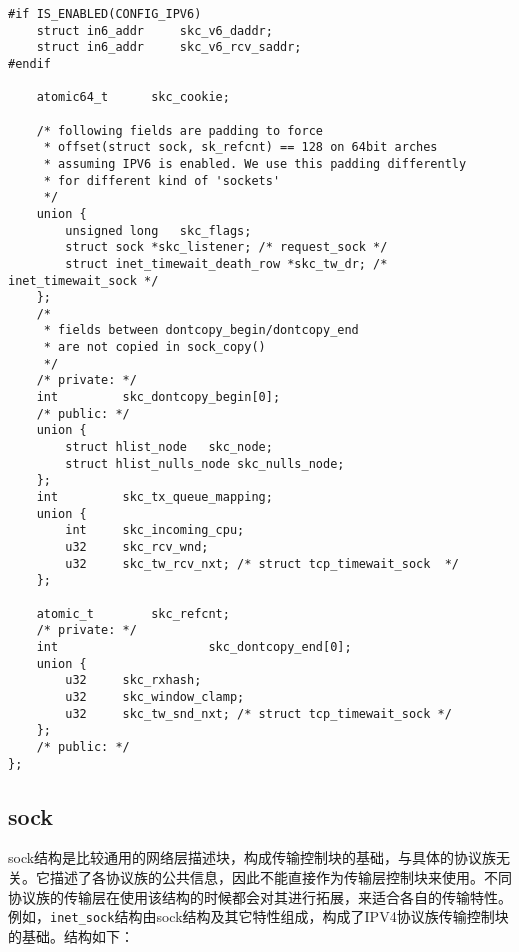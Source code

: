 \begin{verbatim}
#if IS_ENABLED(CONFIG_IPV6)
    struct in6_addr     skc_v6_daddr;
    struct in6_addr     skc_v6_rcv_saddr;
#endif

    atomic64_t      skc_cookie;

    /* following fields are padding to force
     * offset(struct sock, sk_refcnt) == 128 on 64bit arches
     * assuming IPV6 is enabled. We use this padding differently
     * for different kind of 'sockets'
     */
    union {
        unsigned long   skc_flags;
        struct sock *skc_listener; /* request_sock */
        struct inet_timewait_death_row *skc_tw_dr; /* inet_timewait_sock */
    };
    /*
     * fields between dontcopy_begin/dontcopy_end
     * are not copied in sock_copy()
     */
    /* private: */
    int         skc_dontcopy_begin[0];
    /* public: */
    union {
        struct hlist_node   skc_node;
        struct hlist_nulls_node skc_nulls_node;
    };
    int         skc_tx_queue_mapping;
    union {
        int     skc_incoming_cpu;
        u32     skc_rcv_wnd;
        u32     skc_tw_rcv_nxt; /* struct tcp_timewait_sock  */
    };

    atomic_t        skc_refcnt;
    /* private: */
    int                     skc_dontcopy_end[0];
    union {
        u32     skc_rxhash;
        u32     skc_window_clamp;
        u32     skc_tw_snd_nxt; /* struct tcp_timewait_sock */
    };
    /* public: */
};
\end{verbatim}
        \subsection{sock}
            sock结构是比较通用的网络层描述块，构成传输控制块的基础，与具体的协议族无关。它描述了各协议族的公共信息，因此不能直接作为传输层控制块来使用。不同协议族的传输层在使用该结构的时候都会对其进行拓展，来适合各自的传输特性。例如，\texttt{inet_sock}结构由sock结构及其它特性组成，构成了IPV4协议族传输控制块的基础。结构如下：

